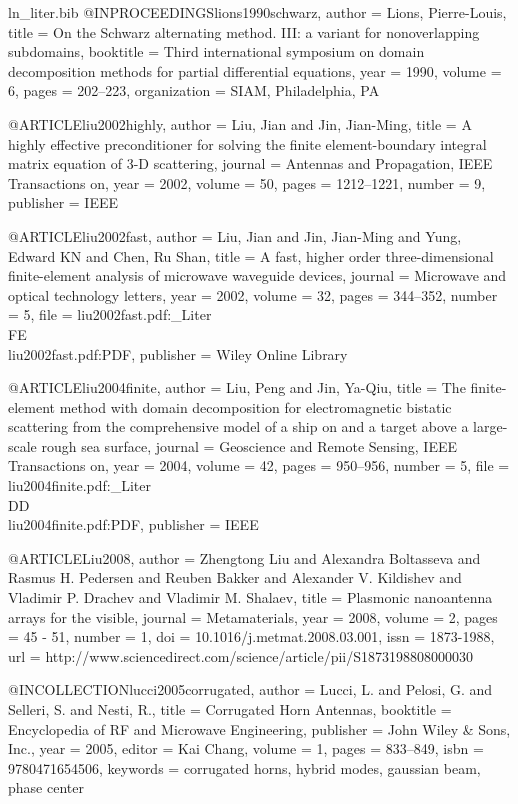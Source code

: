 \begin{filecontents*}{ln_liter.bib}
@INPROCEEDINGS{lions1990schwarz,
  author = {Lions, Pierre-Louis},
  title = {On the Schwarz alternating method. III: a variant for nonoverlapping
	subdomains},
  booktitle = {Third international symposium on domain decomposition methods for
	partial differential equations},
  year = {1990},
  volume = {6},
  pages = {202--223},
  organization = {SIAM, Philadelphia, PA}
}

@ARTICLE{liu2002highly,
  author = {Liu, Jian and Jin, Jian-Ming},
  title = {A highly effective preconditioner for solving the finite element-boundary
	integral matrix equation of {3-D} scattering},
  journal = {Antennas and Propagation, IEEE Transactions on},
  year = {2002},
  volume = {50},
  pages = {1212--1221},
  number = {9},
  publisher = {IEEE}
}

@ARTICLE{liu2002fast,
  author = {Liu, Jian and Jin, Jian-Ming and Yung, Edward KN and Chen, Ru Shan},
  title = {A fast, higher order three-dimensional finite-element analysis of
	microwave waveguide devices},
  journal = {Microwave and optical technology letters},
  year = {2002},
  volume = {32},
  pages = {344--352},
  number = {5},
  file = {liu2002fast.pdf:_Liter\\FE\\liu2002fast.pdf:PDF},
  publisher = {Wiley Online Library}
}

@ARTICLE{liu2004finite,
  author = {Liu, Peng and Jin, Ya-Qiu},
  title = {The finite-element method with domain decomposition for electromagnetic
	bistatic scattering from the comprehensive model of a ship on and
	a target above a large-scale rough sea surface},
  journal = {Geoscience and Remote Sensing, IEEE Transactions on},
  year = {2004},
  volume = {42},
  pages = {950--956},
  number = {5},
  file = {liu2004finite.pdf:_Liter\\DD\\liu2004finite.pdf:PDF},
  publisher = {IEEE}
}

@ARTICLE{Liu2008,
  author = {Zhengtong Liu and Alexandra Boltasseva and Rasmus H. Pedersen and
	Reuben Bakker and Alexander V. Kildishev and Vladimir P. Drachev
	and Vladimir M. Shalaev},
  title = {Plasmonic nanoantenna arrays for the visible},
  journal = {Metamaterials},
  year = {2008},
  volume = {2},
  pages = {45 - 51},
  number = {1},
  doi = {10.1016/j.metmat.2008.03.001},
  issn = {1873-1988},
  url = {http://www.sciencedirect.com/science/article/pii/S1873198808000030}
}

@INCOLLECTION{lucci2005corrugated,
  author = {Lucci, L. and Pelosi, G. and Selleri, S. and Nesti, R.},
  title = {Corrugated Horn Antennas},
  booktitle = {Encyclopedia of RF and Microwave Engineering},
  publisher = {John Wiley \& Sons, Inc.},
  year = {2005},
  editor = {Kai Chang},
  volume = {1},
  pages = {833--849},
  isbn = {9780471654506},
  keywords = {corrugated horns, hybrid modes, gaussian beam, phase center}
}


\end{filecontents*}
